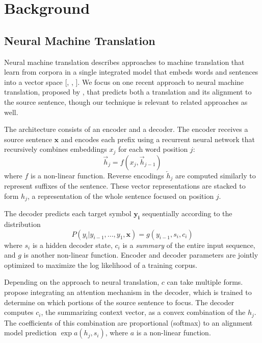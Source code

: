 \section{Background}
\label{sec:background}

\subsection{Neural Machine Translation}
Neural machine translation describes approaches to machine translation that
learn from corpora in a single integrated model that embeds words and sentences
into a vector space
[, , ].
We focus on one recent approach to neural machine translation, proposed
by , that predicts
both a translation and its alignment to the source sentence, though our technique is relevant to
related approaches as well.

The architecture consists of an encoder and a decoder. The encoder receives a
source sentence $\mathbf{x}$ and encodes each prefix using a recurrent neural
network that recursively combines embeddings $x_j$ for each word position $j$:
\begin{equation}
\overrightarrow{h}_{j} = f(x_{j}, \overrightarrow{h}_{j-1})
\end{equation}
where $f$ is a non-linear function. Reverse encodings $\overleftarrow{h}_j$ are
computed similarly to represent suffixes of the sentence. These vector
representations are stacked to form $h_j$, a representation of the whole
sentence focused on position $j$.

The decoder predicts each target symbol $\mathbf{y_i}$ sequentially according
to the distribution
\begin{equation}
P(y_{i} | y_{i-1}, ..., y_{1}, \mathbf{x}) = g(y_{i-1}, s_i, c_i)
\label{eqn:normalize}
\end{equation}
where $s_i$ is a hidden decoder state, $c_i$ is a \emph{summary} of the entire
input sequence, and $g$ is another non-linear function. Encoder and decoder
parameters are jointly optimized to maximize the log likelihood of a training
corpus.

Depending on the approach to neural translation, $c$ can take multiple forms.
 propose integrating an attention mechanism
in the decoder, which is trained to determine on which portions of the source
sentence to focus. The decoder computes $c_{i}$, the summarizing context
vector, as a convex combination of the $h_{j}$. The coefficients of this
combination are proportional (softmax) to an alignment model prediction $\exp a(h_j,
s_i)$, where $a$ is a non-linear function.

